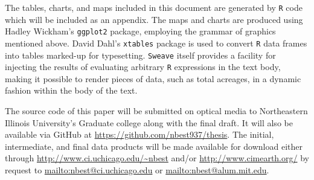 The tables, charts, and maps included in this document are generated
by \texttt{R} code which will be included as an appendix.  The maps
and charts are produced using Hadley Wickham's
\citeyearpar{Wickham2009} \texttt{ggplot2} package, employing the
grammar of graphics mentioned above.  David Dahl's \texttt{xtables}
package is used to convert \texttt{R} data frames into tables
marked-up for typesetting.  \texttt{Sweave} itself provides a facility
for injecting the results of evaluating arbitrary \texttt{R}
expressions in the text body, making it possible to render pieces of
data, such as total acreages, in a dynamic fashion within the body of the text.

The source code of this paper will be submitted on optical media to
Northeastern Illinois University's Graduate college along with the
final draft.  It will also be available via GitHub at
\url{https://github.com/nbest937/thesis}.  The initial, intermediate,
and final data products will be made available for download either
through \url{http://www.ci.uchicago.edu/~nbest} and\slash or
\url{http://www.cimearth.org/} by request to
\url{mailto:nbest@ci.uchicago.edu} or \url{mailto:nbest@alum.mit.edu}.


